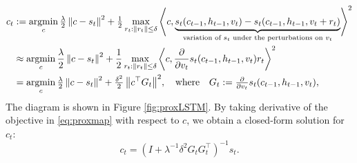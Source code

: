 \documentclass[11pt]{report}
\begin{document}
\vspace{-1.6em}
\begin{align}
\nonumber
c_t &:= \operatorname*{\mathrm{argmin}}_c {{\textstyle \frac{\lambda}{2}} \left\|c - s_t\right\|^2 
	+ {\textstyle \frac{1}{2}}\max_{r_t: \left\|r_t\right\| \le \delta} \left\langle c,\underbrace{s_t(c_{t-1}, h_{t-1}, v_t) - s_t(c_{t-1}, h_{t-1}, v_t + r_t)}_{\text{variation of } s_t \text{ under the perturbations on } v_t} \right\rangle^2} \\
&\approx \operatorname*{\mathrm{argmin}}_c {\frac{\lambda}{2} \left\|c - s_t\right\|^2 
	+ \frac{1}{2} \max_{r_t: \left\|r_t\right\| \le \delta} \left\langle c,\frac{\partial}{\partial v_t} s_t(c_{t-1}, h_{t-1}, v_t) r_t \right\rangle^2} \\
	\label{eq:proxmap}
&= \operatorname*{\mathrm{argmin}}_c {{\textstyle \frac{\lambda}{2}} \left\|c - s_t\right\|^2 
+ {\textstyle \frac{\delta^2}{2}}\left\|c^\top G_t\right\|^2}, 
{\quad \text{where} \quad} G_t := {\textstyle \frac{\partial}{\partial v_t}} s_t(c_{t-1}, h_{t-1}, v_t),
\end{align}
The diagram is shown in Figure \ref{fig:proxLSTM}. 
By taking derivative of the objective in \eqref{eq:proxmap} with respect to $c$,
we obtain a closed-form solution for $c_t$: 
\begin{equation}
\label{eq:ct_expr}
    c_t = (I + \lambda^{-1} \delta^2 G_t G_t^\top)^{-1} s_t.
\end{equation} 
\end{document}
